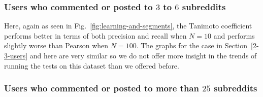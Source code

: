 \documentclass{article}
\begin{document}
\subsubsection{Users who commented or posted to $3$ to $6$ subreddits}\label{3-6-users}

Here, again as seen in Fig.~\ref{fig:learning-and-segments}, the Tanimoto coefficient performs better
in terms of both precision and recall when $N = 10$ and performs slightly worse than Pearson when $N = 100$.
The graphs for the case in Section~\ref{2-3-users} and here are very similar so we do not offer
more insight in the trends of running the tests on this dataset than we offered before. 

\subsubsection{Users who commented or posted to more than $25$ subreddits}\label{more-than-25}
\end{document}
